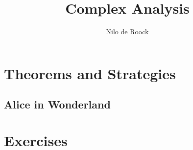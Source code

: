 \documentclass[a4paper,10pt,oneside]{book}
\title{Complex Analysis}
\author{Nilo de Roock}
\date{\Date}
\begin{document}
    \maketitle
    \tableofcontents{}
    \newpage
    \thispagestyle{empty}


    \chapter{Theorems and Strategies}
    \section{Alice in Wonderland}
    \label{sec:Alice}


    \chapter{Exercises}





\end{document}
